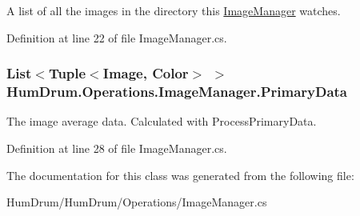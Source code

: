 A list of all the images in the directory this \hyperlink{classHumDrum_1_1Operations_1_1ImageManager}{Image\+Manager} watches. 



Definition at line 22 of file Image\+Manager.\+cs.

\subsubsection[{\texorpdfstring{Primary\+Data}{PrimaryData}}]{\setlength{\rightskip}{0pt plus 5cm}List$<$Tuple$<$Image, Color$>$ $>$ Hum\+Drum.\+Operations.\+Image\+Manager.\+Primary\+Data}\hypertarget{classHumDrum_1_1Operations_1_1ImageManager_ab97884ae2504ef9af7c2ec36f5347b5f}{}\label{classHumDrum_1_1Operations_1_1ImageManager_ab97884ae2504ef9af7c2ec36f5347b5f}


The image average data. Calculated with Process\+Primary\+Data. 



Definition at line 28 of file Image\+Manager.\+cs.



The documentation for this class was generated from the following file\+:\begin{DoxyCompactItemize}
\item 
Hum\+Drum/\+Hum\+Drum/\+Operations/Image\+Manager.\+cs\end{DoxyCompactItemize}
